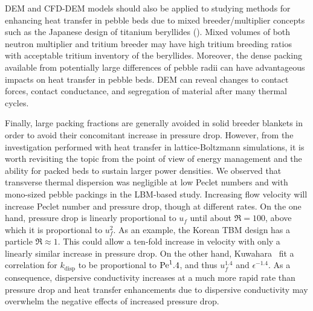 DEM and CFD-DEM models should also be applied to studying methods for enhancing heat transfer in pebble beds due to mixed breeder/multiplier concepts such as the Japanese design of titanium beryllides (). Mixed volumes of both neutron multiplier and tritium breeder may have high tritium breeding ratios with acceptable tritium inventory of the beryllides. Moreover, the dense packing available from potentially large differences of pebble radii can have advantageous impacts on heat transfer in pebble beds. DEM can reveal changes to contact forces, contact conductance, and segregation of material after many thermal cycles. 

Finally, large packing fractions are generally avoided in solid breeder blankets in order to avoid their concomitant increase in pressure drop. However, from the investigation performed with heat transfer in lattice-Boltzmann simulations, it is worth revisiting the topic from the point of view of energy management and the ability for packed beds to sustain larger power densities. We observed that transverse thermal dispersion was negligible at low Peclet numbers and with mono-sized pebble packings in the LBM-based study. Increasing flow velocity will increase Peclet number and pressure drop, though at different rates. On the one hand, pressure drop is linearly proportional to $u_f$ until about $\Re = 100$, above which it is proportional to $u_f^2$. As an example, the Korean TBM design has a particle $\Re \approx 1$. This could allow a ten-fold increase in velocity with only a linearly similar increase in pressure drop. On the other hand, Kuwahara \etal~fit a correlation for $k_\text{disp}$ to be proportional to $\mathrm{Pe}^1.4$, and thus $u_f^{1.4}$ and $\epsilon^{-1.4}$. As a consequence, dispersive conductivity increases at a much more rapid rate than pressure drop and heat transfer enhancements due to dispersive conductivity may overwhelm the negative effects of increased pressure drop.
